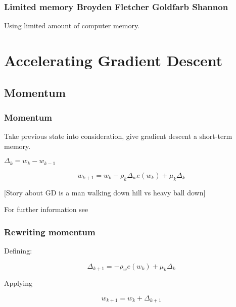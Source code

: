 \begin{frame}
  \frametitle{Limited memory Broyden Fletcher Goldfarb Shannon}
  Using limited amount of computer memory. 

  \cite{Limited-memoryBFGS}
\end{frame}

\section{Accelerating Gradient Descent}

\subsection{Momentum}

\begin{frame}
  \frametitle{Momentum}

  
 Take previous state into consideration,
 give gradient descent a short-term memory. 
 
 $\Delta_k = w_k - w_{k-1}$

 \begin{equation}
  w_{k+1} 
  =
  w_k - \rho_k \Delta_w e(w_k) + \mu_k \Delta_k
 \end{equation}

 [Story about GD is a man walking down hill vs 
 heavy ball down]

 For further information see   \cite{WhyMomentumReallyWorks}

\end{frame}

\begin{frame}
  \frametitle{Rewriting momentum}

  Defining: 

\begin{equation}
  \Delta_{k+1}
  = 
  - \rho_w e(w_k) + \mu_k \Delta_k 
\end{equation}
  
Applying

\begin{equation}
  w_{k+1} = w_k + \Delta_{k+1}
\end{equation}

\end{frame}



